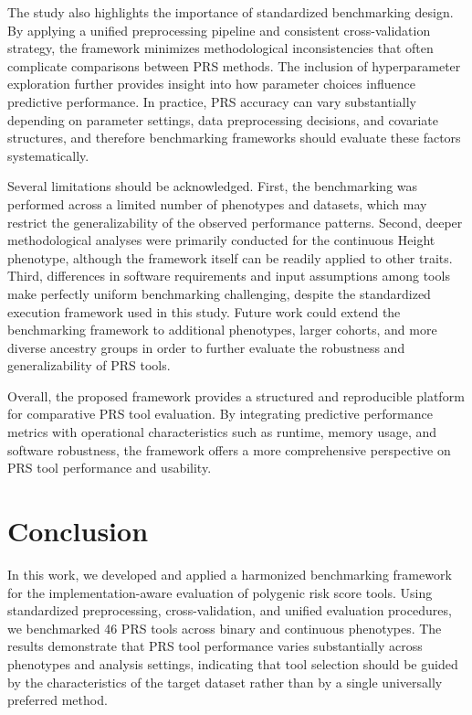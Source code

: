\documentclass[pdflatex,sn-basic]{sn-jnl}
\begin{document}
The study also highlights the importance of standardized benchmarking design. By applying a unified preprocessing pipeline and consistent cross-validation strategy, the framework minimizes methodological inconsistencies that often complicate comparisons between PRS methods. The inclusion of hyperparameter exploration further provides insight into how parameter choices influence predictive performance. In practice, PRS accuracy can vary substantially depending on parameter settings, data preprocessing decisions, and covariate structures, and therefore benchmarking frameworks should evaluate these factors systematically.

Several limitations should be acknowledged. First, the benchmarking was performed across a limited number of phenotypes and datasets, which may restrict the generalizability of the observed performance patterns. Second, deeper methodological analyses were primarily conducted for the continuous Height phenotype, although the framework itself can be readily applied to other traits. Third, differences in software requirements and input assumptions among tools make perfectly uniform benchmarking challenging, despite the standardized execution framework used in this study. Future work could extend the benchmarking framework to additional phenotypes, larger cohorts, and more diverse ancestry groups in order to further evaluate the robustness and generalizability of PRS tools.

Overall, the proposed framework provides a structured and reproducible platform for comparative PRS tool evaluation. By integrating predictive performance metrics with operational characteristics such as runtime, memory usage, and software robustness, the framework offers a more comprehensive perspective on PRS tool performance and usability.

\section*{Conclusion}

In this work, we developed and applied a harmonized benchmarking framework for the implementation-aware evaluation of polygenic risk score tools. Using standardized preprocessing, cross-validation, and unified evaluation procedures, we benchmarked 46 PRS tools across binary and continuous phenotypes. The results demonstrate that PRS tool performance varies substantially across phenotypes and analysis settings, indicating that tool selection should be guided by the characteristics of the target dataset rather than by a single universally preferred method.
\end{document}
